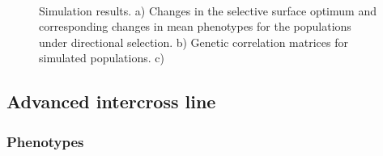 \begin{refsection}
\begin{figure}[htbp]
    \centering
    \vspace{20pt}
    \\
    \vspace{-18pt}
    \vspace{11pt}
    \caption[Simulation results]{Simulation results. a) Changes in the selective surface optimum and corresponding changes in mean phenotypes for the populations under directional selection. b) Genetic correlation matrices for simulated populations. c) }
    \label{simulated}
\end{figure}

\subsection{Advanced intercross line}

\subsubsection{Phenotypes}


\end{refsection}
